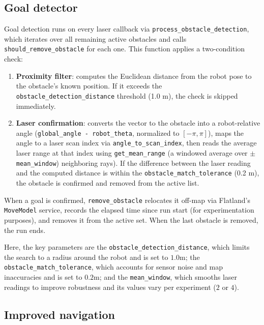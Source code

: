 \documentclass[12pt]{article}
\begin{document}
\subsection{Goal detector}

Goal detection runs on every laser callback via \texttt{process\_obstacle\_detection}, which
iterates over all remaining active obstacles and calls \texttt{should\_remove\_obstacle} for each
one. This function applies a two-condition check:

\begin{enumerate}
    \item \textbf{Proximity filter}: computes the Euclidean distance from the robot pose to the
          obstacle's known position. If it exceeds the \texttt{obstacle\_detection\_distance}
          threshold (1.0 m), the check is skipped immediately.
    \item \textbf{Laser confirmation}: converts the vector to the obstacle into a robot-relative
          angle (\texttt{global\_angle - robot\_theta}, normalized to $[-\pi, \pi]$), maps the angle
          to a laser scan index via \texttt{angle\_to\_scan\_index}, then reads the average laser
          range at that index using \texttt{get\_mean\_range} (a windowed average over $\pm$
          \texttt{mean\_window}) neighboring rays). If the difference between the laser reading and
          the computed distance is within the \texttt{obstacle\_match\_tolerance} (0.2 m), the
          obstacle is confirmed and removed from the active list.
\end{enumerate}

When a goal is confirmed, \texttt{remove\_obstacle} relocates it off-map via Flatland's
\texttt{MoveModel} service, records the elapsed time since run start (for experimentation purposes),
and removes it from the active set. When the last obstacle is removed, the run ends.

Here, the key parameters are the \texttt{obstacle\_detection\_distance}, which limits the search to
a radius around the robot and is set to $1.0$m; the \texttt{obstacle\_match\_tolerance},
which accounts for sensor noise and map inaccuracies and is set to $0.2$m; and the
\texttt{mean\_window}, which smooths laser readings to improve robustness and its values vary per
experiment ($2$ or $4$).

\subsection{Improved navigation}
\end{document}
